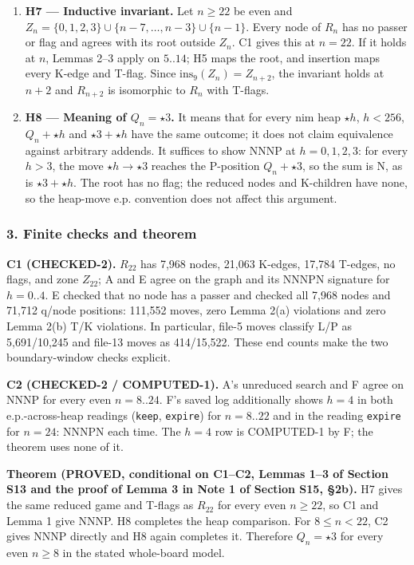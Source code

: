 \begin{enumerate}
\item \textbf{H7 — Inductive invariant.} Let $n\ge22$ be even and $Z_n=\{0,1,2,3\}\cup\{n-7,\ldots,n-3\}\cup\{n-1\}$. Every node of $R_n$ has no passer or flag and agrees with its root outside $Z_n$. C1 gives this at $n=22$. If it holds at $n$, Lemmas 2–3 apply on $5..14$; H5 maps the root, and insertion maps every K-edge and T-flag. Since $\mathrm{ins}_9(Z_n)=Z_{n+2}$, the invariant holds at $n+2$ and $R_{n+2}$ is isomorphic to $R_n$ with T-flags.
\item \textbf{H8 — Meaning of $Q_n=\star3$.} It means that for every nim heap $\star h$, $h<256$, $Q_n+\star h$ and $\star3+\star h$ have the same outcome; it does not claim equivalence against arbitrary addends. It suffices to show NNNP at $h=0,1,2,3$: for every $h>3$, the move $\star h\to\star3$ reaches the P-position $Q_n+\star3$, so the sum is N, as is $\star3+\star h$. The root has no flag; the reduced nodes and K-children have none, so the heap-move e.p. convention does not affect this argument.
\end{enumerate}
\subsubsection*{3. Finite checks and theorem}
\textbf{C1 (CHECKED-2).} $R_{22}$ has 7,968 nodes, 21,063 K-edges, 17,784 T-edges, no flags, and zone $Z_{22}$; A and E agree on the graph and its NNNPN signature for $h=0..4$. E checked that no node has a passer and checked all 7,968 nodes and 71,712 q/node positions: 111,552 moves, zero Lemma 2(a) violations and zero Lemma 2(b) T/K violations. In particular, file-5 moves classify L/P as 5,691/10,245 and file-13 moves as 414/15,522. These end counts make the two boundary-window checks explicit.

\textbf{C2 (CHECKED-2 / COMPUTED-1).} A's unreduced search and F agree on NNNP for every even $n=8..24$. F's saved log additionally shows $h=4$ in both e.p.-across-heap readings (\texttt{keep}, \texttt{expire}) for $n=8..22$ and in the reading \texttt{expire} for $n=24$: NNNPN each time. The $h=4$ row is COMPUTED-1 by F; the theorem uses none of it.

\textbf{Theorem (PROVED, conditional on C1–C2, Lemmas 1–3 of Section S13 and the proof of Lemma 3 in Note 1 of Section S15, §2b).} H7 gives the same reduced game and T-flags as $R_{22}$ for every even $n\ge22$, so C1 and Lemma 1 give NNNP. H8 completes the heap comparison. For $8\le n<22$, C2 gives NNNP directly and H8 again completes it. Therefore $Q_n=\star3$ for every even $n\ge8$ in the stated whole-board model.



